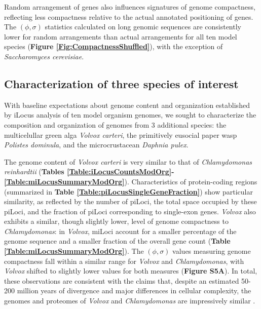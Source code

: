 Random arrangement of genes also influences signatures of genome compactness, reflecting less compactness relative to the actual annotated positioning of genes.
The $(\phi, \sigma)$ statistics calculated on long genomic sequences are consistently lower for random arrangements than actual arrangements for all ten model species (\textbf{Figure \ref{Fig:CompactnessShuffled}}), with the exception of \textit{Saccharomyces cerevisiae}.

\subsection{Characterization of three species of interest}

With baseline expectations about genome content and organization established by iLocus analysis of ten model organism genomes, we sought to characterize the composition and organization of genomes from 3 additional species: the multicelullar green alga \textit{Volvox carteri}, the primitively eusocial paper wasp \textit{Polistes dominula}, and the microcrustacean \textit{Daphnia pulex}.

The genome content of \textit{Volvox carteri} is very similar to that of \textit{Chlamydomonas reinhardtii} (\textbf{Tables \ref{Table:iLocusCountsModOrg}-\ref{Table:miLocusSummaryModOrg}}).
Characteristics of protein-coding regions (summarized in \textbf{Table \ref{Table:piLocusSingleGeneFraction}}) show particular similarity, as reflected by the number of piLoci, the total space occupied by these piLoci, and the fraction of piLoci corresponding to single-exon genes.
\textit{Volvox} also exhibits a similar, though slightly lower, level of genome compactness to \textit{Chlamydomonas}:
in \textit{Volvox}, miLoci account for a smaller percentage of the genome sequence and a smaller fraction of the overall gene count (\textbf{Table \ref{Table:miLocusSummaryModOrg}}).
The $(\phi, \sigma)$ values measuring genome compactness fall within a similar range for \textit{Volvox} and \textit{Chlamydomonas}, with \textit{Volvox} shifted to slightly lower values for both measures (\textbf{Figure S5A}).
In total, these observations are consistent with the claims that, despite an estimated 50-200 million years of divergence and major differences in cellular complexity, the genomes and proteomes of \textit{Volvox} and \textit{Chlamydomonas} are impressively similar \cite{VolvoxGenome}.

